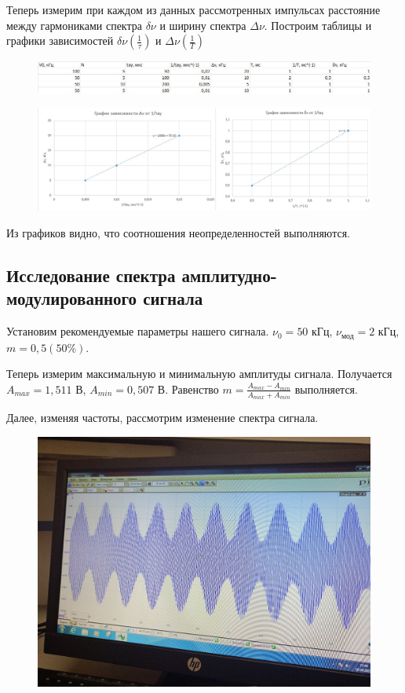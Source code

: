 \documentclass[a4paper,12pt]{article}
\begin{document}
Теперь измерим при каждом из данных рассмотренных импульсах расстояние между гармониками спектра $\delta \nu$ и ширину спектра $\Delta \nu$. Построим таблицы и графики зависимостей $\delta \nu(\frac{1}{\tau})$ и $\Delta \nu (\frac{1}{T})$

\begin{figure}[H]
\begin{center}
    \includegraphics[width=1\textwidth]{B.15.tabl}
\end{center}
\end{figure}

\begin{figure}[H]
    \includegraphics[width=1\textwidth]{B.15.grapg}
\end{figure}

Из графиков видно, что соотношения неопределенностей выполняются.

\subsection*{Исследование спектра амплитудно-модулированного сигнала}
Установим рекомендуемые параметры нашего сигнала. $\nu_0 = 50$ кГц, $\nu_{\text{мод}} = 2$ кГц, $m = 0,5(50\%)$.

Теперь измерим максимальную и минимальную амплитуды сигнала. Получается $A_{max} = 1,511 $ В, $A_{min} = 0,507$ В. Равенство $m = \frac{A_{max} - A_{min}}{A_{max} + A_{min}}$ выполняется.

Далее, изменяя частоты, рассмотрим изменение спектра сигнала.
\begin{figure}[H]
\begin{center}
    \includegraphics[width=.5\textwidth]{G.21.1.graph}
\end{center}
\end{figure}
\end{document}
